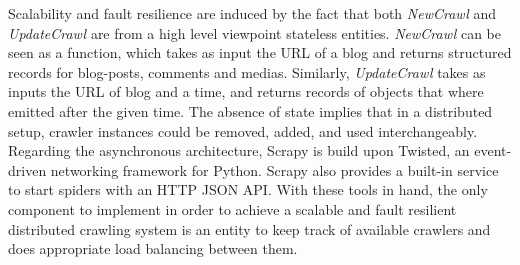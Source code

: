 
Scalability and fault resilience are induced by the fact that both \emph{NewCrawl} and \emph{UpdateCrawl} are from a high level viewpoint stateless entities. \emph{NewCrawl} can be seen as a function, which takes as input the URL of a blog and returns structured records for blog-posts, comments and medias. Similarly, \emph{UpdateCrawl} takes as inputs the URL of blog and a time, and returns records of objects that where emitted after the given time. The absence of state implies that in a distributed setup, crawler instances could be removed, added, and used interchangeably. Regarding the asynchronous architecture, Scrapy is build upon Twisted\cite{twisted2013}, an event-driven networking framework for Python. Scrapy also provides a built-in service to start spiders with an HTTP JSON API. With these tools in hand, the only component to implement in order to achieve a scalable and fault resilient distributed crawling system is an entity to keep track of available crawlers and does appropriate load balancing between them.
